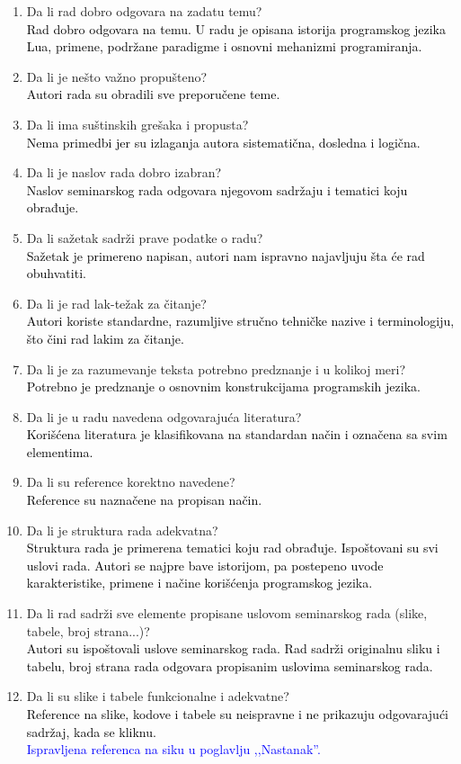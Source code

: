 \documentclass[a4paper]{report}
\newcommand{\odgovor}[1]{\textcolor{black}{#1}}
\newcommand{\odgovorAutora}[1]{\textcolor{blue}{#1}}
\begin{document}
\begin{enumerate}
\item Da li rad dobro odgovara na zadatu temu?\\
\odgovor{Rad dobro odgovara na temu. U radu je opisana istorija programskog jezika Lua, primene, podržane paradigme i osnovni mehanizmi programiranja.}
\item Da li je nešto važno propušteno?\\
\odgovor{Autori rada su obradili sve preporučene teme.}
\item Da li ima suštinskih grešaka i propusta?\\
\odgovor{Nema primedbi jer su izlaganja autora sistematična, dosledna i logična.}
\item Da li je naslov rada dobro izabran?\\
\odgovor{Naslov seminarskog rada odgovara njegovom sadržaju i tematici koju obrađuje.}
\item Da li sažetak sadrži prave podatke o radu?\\
\odgovor{Sažetak je primereno napisan, autori nam ispravno najavljuju šta će rad obuhvatiti.}
\item Da li je rad lak-težak za čitanje?\\
\odgovor{Autori koriste standardne, razumljive stručno tehničke nazive i terminologiju, što čini rad lakim za čitanje.}
\item Da li je za razumevanje teksta potrebno predznanje i u kolikoj meri?\\
\odgovor{Potrebno je predznanje o osnovnim konstrukcijama programskih jezika.}
\item Da li je u radu navedena odgovarajuća literatura?\\
\odgovor{Korišćena literatura je klasifikovana na standardan način i označena sa svim elementima.}
\item Da li su reference korektno navedene?\\
\odgovor{Reference su naznačene na propisan način.}
\item Da li je struktura rada adekvatna?\\
\odgovor{Struktura rada je primerena tematici koju rad obrađuje. Ispoštovani su svi uslovi rada. Autori se najpre bave istorijom, pa postepeno uvode karakteristike, primene i načine korišćenja programskog jezika.}
\item Da li rad sadrži sve elemente propisane uslovom seminarskog rada (slike, tabele, broj strana...)?\\
\odgovor{Autori su ispoštovali uslove seminarskog rada. Rad sadrži originalnu sliku i tabelu, broj strana rada odgovara propisanim uslovima seminarskog rada.}
\item Da li su slike i tabele funkcionalne i adekvatne?\\
\odgovor{Reference na slike, kodove i tabele su neispravne i ne prikazuju odgovarajući sadržaj, kada se kliknu.} \\
\odgovorAutora{Ispravljena referenca na siku u poglavlju ,,Nastanak''.}
\end{enumerate}
\end{document}
